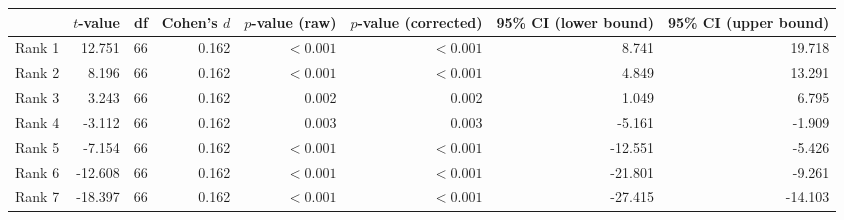\begin{tabular}{lrrrrrrr}
\toprule
{} & $t$-value & df & Cohen's $d$ & $p$-value (raw) & $p$-value (corrected) & 95\% CI (lower bound) & 95\% CI (upper bound) \\
\midrule
Rank 1 &    12.751 & 66 &       0.162 &       $< 0.001$ &             $< 0.001$ &                 8.741 &                19.718 \\
Rank 2 &     8.196 & 66 &       0.162 &       $< 0.001$ &             $< 0.001$ &                 4.849 &                13.291 \\
Rank 3 &     3.243 & 66 &       0.162 &           0.002 &                 0.002 &                 1.049 &                 6.795 \\
Rank 4 &    -3.112 & 66 &       0.162 &           0.003 &                 0.003 &                -5.161 &                -1.909 \\
Rank 5 &    -7.154 & 66 &       0.162 &       $< 0.001$ &             $< 0.001$ &               -12.551 &                -5.426 \\
Rank 6 &   -12.608 & 66 &       0.162 &       $< 0.001$ &             $< 0.001$ &               -21.801 &                -9.261 \\
Rank 7 &   -18.397 & 66 &       0.162 &       $< 0.001$ &             $< 0.001$ &               -27.415 &               -14.103 \\
\bottomrule
\end{tabular}
